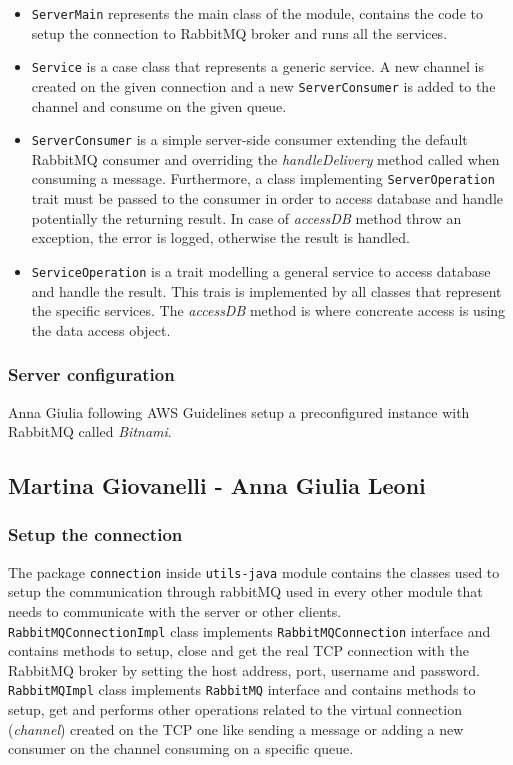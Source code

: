 \documentclass[a4paper,12pt]{report}
\begin{document}
\begin{itemize}
\item \texttt{ServerMain} represents the main class of the module, contains the code to setup the connection to RabbitMQ broker and runs all the services.
\item \texttt{Service} is a case class that represents a generic service. A new channel is created on the given connection and a new \texttt{ServerConsumer} is added to the channel and consume on the given queue.
\item \texttt{ServerConsumer} is a simple server-side consumer extending the default RabbitMQ consumer and overriding the \emph{handleDelivery} method called when consuming a message. Furthermore, a class implementing \texttt{ServerOperation} trait must be passed to the consumer in order to access database and handle potentially the returning result. In case of \emph{accessDB} method throw an exception, the error is logged, otherwise the result is handled. 
\item \texttt{ServiceOperation} is a trait modelling a general service to access database and handle the result. This trais is implemented by all classes that represent the specific services. The \emph{accessDB} method is where concreate access is using the data access object.
\end{itemize}

\subsubsection{Server configuration}
Anna Giulia following AWS Guidelines setup a preconfigured instance with RabbitMQ called \emph{Bitnami}.

\subsection{Martina Giovanelli - Anna Giulia Leoni}

\subsubsection{Setup the connection}
The package \texttt{connection} inside \texttt{utils-java} module contains the classes used to setup the communication through rabbitMQ used in every other module that needs to communicate with the server or other clients.
\\\texttt{RabbitMQConnectionImpl} class implements \texttt{RabbitMQConnection} interface and contains methods to setup, close and get the real TCP connection with the RabbitMQ broker by setting the host address, port, username and password. 
\\\texttt{RabbitMQImpl} class implements \texttt{RabbitMQ} interface and contains methods to setup, get and performs other operations related to the virtual connection (\textit{channel}) created on the TCP one like sending a message or adding a new consumer on the channel consuming on a specific queue.
\end{document}
